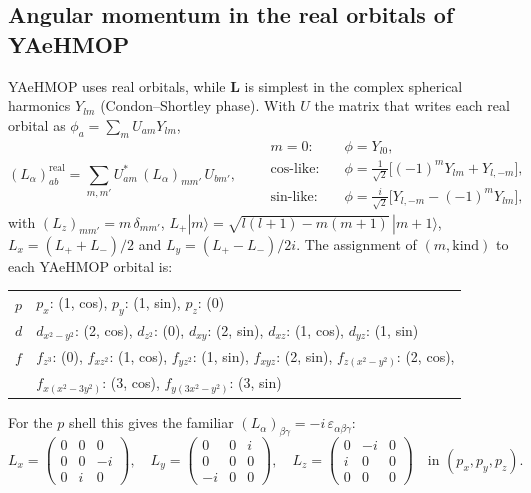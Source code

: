 \documentclass[11pt,a4paper]{article}
\begin{document}
\subsection{Angular momentum in the real orbitals of YAeHMOP}\label{sec:L}

YAeHMOP uses real orbitals, while $\mathbf{L}$ is simplest in the complex spherical
harmonics $Y_{lm}$ (Condon--Shortley phase). With $U$ the matrix that writes each real
orbital as $\phi_a = \sum_m U_{am}Y_{lm}$,
\begin{equation}
(L_\alpha)^{\text{real}}_{ab} = \sum_{m,m'} U^{*}_{am}\,(L_\alpha)_{mm'}\,U_{bm'},
\qquad
\begin{aligned}
\text{$m=0$:}\quad & \phi = Y_{l0},\\
\text{cos-like:}\quad & \phi = \tfrac{1}{\sqrt2}\big[(-1)^m Y_{lm} + Y_{l,-m}\big],\\
\text{sin-like:}\quad & \phi = \tfrac{i}{\sqrt2}\big[Y_{l,-m} - (-1)^m Y_{lm}\big],
\end{aligned}
\end{equation}
with $(L_z)_{mm'}=m\,\delta_{mm'}$, $L_+|m\rangle=\sqrt{l(l+1)-m(m+1)}\,|m+1\rangle$,
$L_x=(L_++L_-)/2$ and $L_y=(L_+-L_-)/2i$. The assignment of $(m,\text{kind})$ to each
YAeHMOP orbital is:
\begin{center}
\begin{tabular}{l l}
\toprule
$p$ & $p_x$: (1, cos), $p_y$: (1, sin), $p_z$: (0) \\
$d$ & $d_{x^2-y^2}$: (2, cos), $d_{z^2}$: (0), $d_{xy}$: (2, sin), $d_{xz}$: (1, cos), $d_{yz}$: (1, sin) \\
$f$ & $f_{z^3}$: (0), $f_{xz^2}$: (1, cos), $f_{yz^2}$: (1, sin), $f_{xyz}$: (2, sin), $f_{z(x^2-y^2)}$: (2, cos),\\
    & $f_{x(x^2-3y^2)}$: (3, cos), $f_{y(3x^2-y^2)}$: (3, sin) \\
\bottomrule
\end{tabular}
\end{center}
For the $p$ shell this gives the familiar $(L_\alpha)_{\beta\gamma}=-i\,\varepsilon_{\alpha\beta\gamma}$:
\begin{equation}
L_x=\begin{pmatrix}0&0&0\\0&0&-i\\0&i&0\end{pmatrix},\quad
L_y=\begin{pmatrix}0&0&i\\0&0&0\\-i&0&0\end{pmatrix},\quad
L_z=\begin{pmatrix}0&-i&0\\i&0&0\\0&0&0\end{pmatrix}
\quad\text{in }(p_x,p_y,p_z).
\end{equation}
\end{document}
